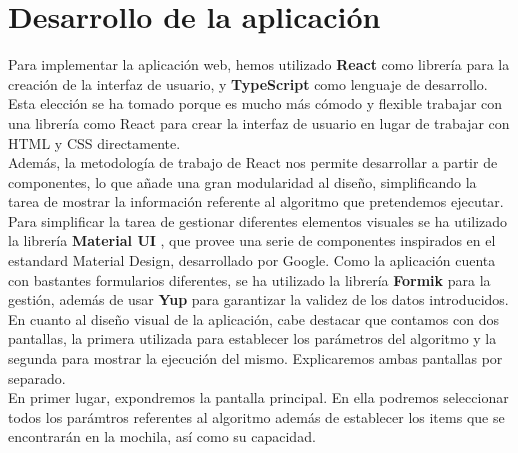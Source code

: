 \section{Desarrollo de la aplicación}

Para implementar la aplicación web, hemos utilizado \textbf{React} \cite{react} como librería para la creación de la interfaz de usuario, y \textbf{TypeScript} como lenguaje de desarrollo. Esta elección se ha tomado porque es mucho más cómodo y flexible trabajar con una librería como React para crear la interfaz de usuario en lugar de trabajar con HTML y CSS directamente. \\

Además, la metodología de trabajo de React nos permite desarrollar a partir de componentes, lo que añade una gran modularidad al diseño, simplificando la tarea de mostrar la información referente al algoritmo que pretendemos ejecutar. \\

Para simplificar la tarea de gestionar diferentes elementos visuales se ha utilizado la librería \textbf{Material UI} \cite{materialui}, que provee una serie de componentes inspirados en el estandard Material Design, desarrollado por Google. Como la aplicación cuenta con bastantes formularios diferentes, se ha utilizado la librería \textbf{Formik} \cite{formik} para la gestión, además de usar \textbf{Yup} \cite{yup} para garantizar la validez de los datos introducidos. \\

En cuanto al diseño visual de la aplicación, cabe destacar que contamos con dos pantallas, la primera utilizada para establecer los parámetros del algoritmo y la segunda para mostrar la ejecución del mismo. Explicaremos ambas pantallas por separado. \\

En primer lugar, expondremos la pantalla principal. En ella podremos seleccionar todos los parámtros referentes al algoritmo además de establecer los items que se encontrarán en la mochila, así como su capacidad. \\

